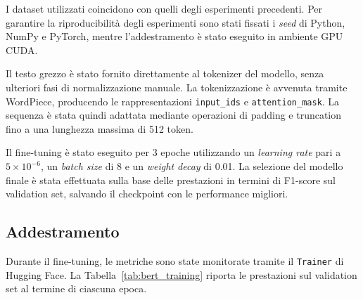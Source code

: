 \documentclass{article}
\begin{document}
I dataset utilizzati coincidono con quelli degli esperimenti precedenti. Per garantire la riproducibilità degli esperimenti sono stati fissati i \textit{seed} di Python, NumPy e PyTorch, mentre l’addestramento è stato eseguito in ambiente GPU CUDA.

Il testo grezzo è stato fornito direttamente al tokenizer del modello, senza ulteriori fasi di normalizzazione manuale. La tokenizzazione è avvenuta tramite WordPiece, producendo le rappresentazioni \texttt{input\_ids} e \texttt{attention\_mask}. La sequenza è stata quindi adattata mediante operazioni di padding e truncation fino a una lunghezza massima di 512 token.

Il fine-tuning è stato eseguito per 3 epoche utilizzando un \textit{learning rate} pari a $5 \times 10^{-6}$, un \textit{batch size} di 8 e un \textit{weight decay} di 0.01. La selezione del modello finale è stata effettuata sulla base delle prestazioni in termini di F1-score sul validation set, salvando il checkpoint con le performance migliori.

\subsection{Addestramento}

Durante il fine-tuning, le metriche sono state monitorate tramite il \texttt{Trainer} di Hugging Face. La Tabella~\ref{tab:bert_training} riporta le prestazioni sul validation set al termine di ciascuna epoca.
\end{document}
